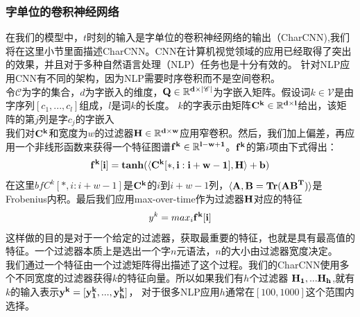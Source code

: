 \subsubsection{字单位的卷积神经网络}
在我们的模型中，$t$时刻的输入是字单位的卷积神经网络的输出（CharCNN),我们将在这里小节里面描述CharCNN。CNN在计算机视觉领域的应用已经取得了突出的效果，并且对于多种自然语言处理（NLP）任务也是十分有效的。
针对NLP应用CNN有不同的架构，因为NLP需要时序卷积而不是空间卷积。\\
令$\mathscr{C}$为字的集合，$d$为字嵌入的维度，$\bf{Q} \in \mathbb{R}^{d \times | \mathscr{C} |}$为字嵌入矩阵。假设词$k \in \mathscr{V}$是由字序列$[c_1,...,c_l]$组成，$l$是词$k$的长度。
$k$的字表示由矩阵$\bf{C}^k \in \mathbb{R}^{d \times l}$给出，该矩阵的第$j$列是字$c_j$的字嵌入\\
我们对$\bf{C}^k$和宽度为$w$的过滤器$\bf{H} \in \mathbb{R}^{d \times w}$应用窄卷积。然后，我们加上偏差，再应用一个非线形函数来获得一个特征图谱$\bf{f}^k \in \mathbb{R}^{l - w + 1}$。$\bf{f}^k$的第$i$项由下式得出：\\
\begin{equation}
\bf{f}^k[i] = tanh(\langle \bf{C}^k[*,i:i+w-1],\bf{H}\rangle + b)
\end{equation}
在这里$bf{C}^k[*,i:i+w-1]$是$\bf{C}^k$的$i$到$i+w-1$列，$\langle \bf{A},\bf{B} = Tr(\bf{AB}^T)\rangle$是Frobenius内积。最后我们应用max-over-time作为过滤器$\bf{H}$对应的特征\\
\begin{equation}
y^k = max_i\bf{f}^k[i]
\end{equation}
这样做的目的是对于一个给定的过滤器，获取最重要的特征，也就是具有最高值的特征。一个过滤器本质上是选出一个字$n$元语法，$n$的大小由过滤器宽度决定。\\
我们通过一个特征由一个过滤矩阵得出描述了这个过程。我们的CharCNN使用多个不同宽度的过滤器获得$k$的特征向量。所以如果我们有$h$个过滤器 $\bf{H}_1,...\bf{H}_h$,就有$k$的输入表示$\bf{y}^k = [y^k_1,...,y^k_h]$，
对于很多NLP应用$h$通常在$[100,1000]$这个范围内选择。\\
